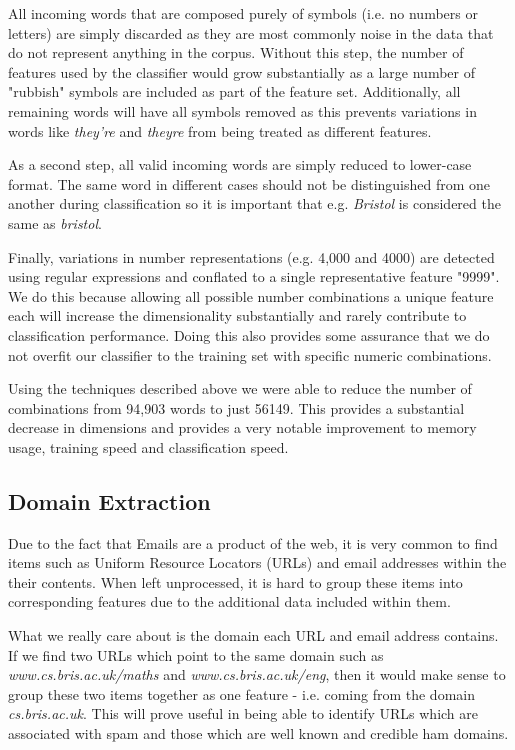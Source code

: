All incoming words that are composed purely of symbols (i.e. no numbers or letters) are simply discarded as they are most commonly noise in the data that do not represent anything in the corpus. Without this step, the number of features used by the classifier would grow substantially as a large number of "rubbish" symbols are included as part of the feature set. Additionally, all remaining words will have all symbols removed as this prevents variations in words like {\it they're} and {\it theyre} from being treated as different features.

As a second step, all valid incoming words are simply reduced to lower-case format. The same word in different cases should not be distinguished from one another during classification so it is important that e.g. {\it Bristol} is considered the same as {\it bristol}.

Finally, variations in number representations (e.g. 4,000 and 4000) are detected using regular expressions and conflated to a single representative feature "9999". We do this because allowing all possible number combinations a unique feature each will increase the dimensionality substantially and rarely contribute to classification performance. Doing this also provides some assurance that we do not overfit our classifier to the training set with specific numeric combinations.

Using the techniques described above we were able to reduce the number of  combinations from 94,903 words to just 56149. This provides a substantial decrease in dimensions and provides a very notable improvement to memory usage, training speed and classification speed. 

\subsection{Domain Extraction}

Due to the fact that Emails are a product of the web, it is very common to find items such as Uniform Resource Locators (URLs) and email addresses within the their contents. When left unprocessed, it is hard to group these items into corresponding features due to the additional data included within them.

What we really care about is the domain each URL and email address contains. If we find two URLs which point to the same domain such as \emph{www.cs.bris.ac.uk/maths} and {\it www.cs.bris.ac.uk/eng}, then it would make sense to group these two items together as one feature - i.e. coming from the domain \emph{cs.bris.ac.uk}. This will prove useful in being able to identify URLs which are associated with spam and those which are well known and credible ham domains.

